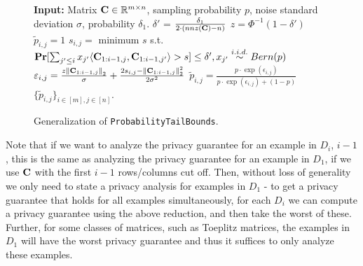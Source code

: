 \begin{figure}
\begin{algorithm}[H]
\caption{\texttt{GeneralizedProbabilityTailBounds}($\bfC, p, \sigma, \delta_1)$}
\begin{algorithmic}[1]
\State \textbf{Input:} Matrix $\mathbf{C} \in \mathbb{R}^{m \times n}$, sampling probability $p$, noise standard deviation $\sigma$, probability $\delta_1$.
\State $\delta'$ = $\frac{\delta_1}{2 \cdot (nnz(\mathbf{C}) - n)}$ 
\State $z = \Phi^{-1}(1 - \delta')$ 
\State $\tilde{p}_{i, j} = 1$
\Else 
\State $s_{i,j} = $ minimum $s$ s.t. $\mathop{\mathbf{Pr}}[\sum_{j' \leq i} x_{j'} \langle \mathbf{C}_{1:i-1,j}, \mathbf{C}_{1:i-1, j'} \rangle > s] \leq \delta', x_{j'} \stackrel{i.i.d.}{\sim} Bern(p)$\newline {}
\State $\varepsilon_{i, j} = \frac{z \left\|\mathbf{C}_{1:i-1, j}\right\|_2}{\sigma} + \frac{2s_{i,j}- \left\|\mathbf{C}_{1:i-1, j}\right\|_2^2}{2\sigma^2}$ \newline {}
\State $\tilde{p}_{i, j} = \frac{p \cdot \exp\left(\epsilon_{i, j}\right)}{p \cdot \exp\left(\epsilon_{i, j}\right) + (1-p)}$
\EndIf
\EndFor
\State \Return $\{\tilde{p}_{i,j}\}_{i \in [m], j \in [n]}$. 
\end{algorithmic}
\end{algorithm}
\caption{Generalization of \texttt{ProbabilityTailBounds}.}
\label{fig:cptb-subroutine-generalization}
\end{figure}

Note that if we want to analyze the privacy guarantee for an example in $D_i$, $i-1$, this is the same as analyzing the privacy guarantee for an example in $D_1$, if we use $\mathbf{C}$ with the first $i-1$ rows/columns cut off. Then, without loss of generality we only need to state a privacy analysis for examples in $D_1$ - to get a privacy guarantee that holds for all examples simultaneously, for each $D_i$ we can compute a privacy guarantee using the above reduction, and then take the worst of these. Further, for some classes of matrices, such as Toeplitz matrices, the examples in $D_1$ will have the worst privacy guarantee and thus it suffices to only analyze these examples.


